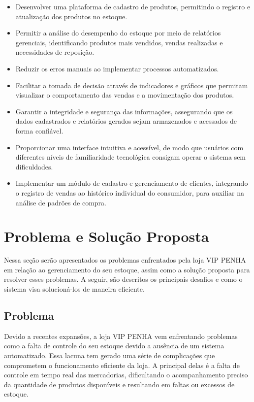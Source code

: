\documentclass[
	12pt,				%
	openany,			%
	twoside,			%
	a4paper,			%
	english,			%
	brazil				%
	]{abntex2}
\begin{document}
\begin{itemize}
    \item Desenvolver uma plataforma de cadastro de produtos, permitindo o registro e atualização dos produtos no estoque.
    \item Permitir a análise do desempenho do estoque por meio de relatórios gerenciais, identificando produtos mais vendidos, vendas realizadas e necessidades de reposição.
    \item Reduzir os erros manuais ao implementar processos automatizados.
    \item Facilitar a tomada de decisão através de indicadores e gráficos que permitam visualizar o comportamento das vendas e a movimentação dos produtos.
    \item Garantir a integridade e segurança das informações, assegurando que os dados cadastrados e relatórios gerados sejam armazenados e acessados de forma confiável.
    \item Proporcionar uma interface intuitiva e acessível, de modo que usuários com diferentes níveis de familiaridade tecnológica consigam operar o sistema sem dificuldades.
    \item Implementar um módulo de cadastro e gerenciamento de clientes, integrando o registro de vendas ao histórico individual do consumidor, para auxiliar na análise de padrões de compra.
\end{itemize}

\section{Problema e Solução Proposta}

Nessa seção serão apresentados os problemas enfrentados pela loja VIP PENHA em relação ao gerenciamento do seu estoque, assim como a solução proposta para resolver esses problemas. A seguir, são descritos os principais desafios e como o sistema visa solucioná-los de maneira eficiente.

\subsection{Problema}

Devido a recentes expansões, a loja VIP PENHA vem enfrentando problemas como a falta de controle do seu estoque devido a ausência de um sistema automatizado. Essa lacuna tem gerado uma série de complicações que comprometem o funcionamento eficiente da loja. A principal delas é a falta de controle em tempo real das mercadorias, dificultando o acompanhamento preciso da quantidade de produtos disponíveis e resultando em faltas ou excessos de estoque.
\end{document}
